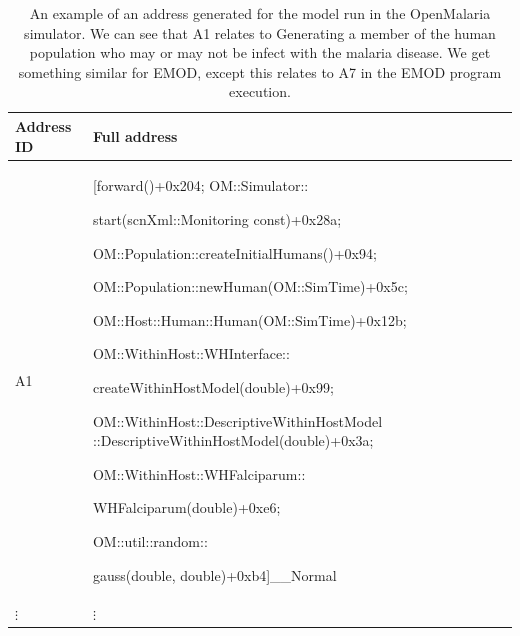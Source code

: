\documentclass{article}
\begin{document}
\begin{table}[h!]
\footnotesize
  \setlength{\tabcolsep}{1mm}
\label{table:asingleaddress}
  \caption{An example of an address generated for the model run in the OpenMalaria simulator. We can see that A1
  relates to Generating a member of the human population who may or may not be infect with the malaria disease. We get something similar for EMOD, except this relates to A7 in the EMOD program execution.}
  \def\arraystretch{1.25}
  \begin{tabularx}{0.46\textwidth}{@{}lX@{}l@{}} 
    \toprule
    Address ID & Full address \\
    \midrule
  A1 & [forward()+0x204; OM::Simulator::

  start(scnXml::Monitoring const)+0x28a;

  OM::Population::createInitialHumans()+0x94;

  OM::Population::newHuman(OM::SimTime)+0x5c;

  OM::Host::Human::Human(OM::SimTime)+0x12b;

  OM::WithinHost::WHInterface::

  createWithinHostModel(double)+0x99;

  OM::WithinHost::DescriptiveWithinHostModel
  ::DescriptiveWithinHostModel(double)+0x3a;

  OM::WithinHost::WHFalciparum::

  WHFalciparum(double)+0xe6;

  OM::util::random::

  gauss(double, double)+0xb4]\_\_Normal \\

  $\vdots$ & $\vdots$ \\









\bottomrule
  \end{tabularx}
  \end{table}
\end{document}
